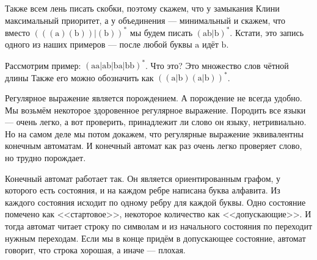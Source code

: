 \documentclass{article}
\begin{document}
\begin{itemize}
\begin{Comment}
            Также всем лень писать скобки, поэтому скажем, что у замыкания Клини максимальный приоритет, а у объединения --- минимальный и скажем, что вместо $(((\mathrm a)(\mathrm b))|(\mathrm b))^*$ мы будем писать $(\mathrm a\mathrm b|\mathrm b)^*$. Кстати, это запись одного из наших примеров --- после любой буквы $\mathrm a$ идёт $\mathrm b$.
        \end{Comment}
        \begin{Example}
            Рассмотрим пример: $(\mathrm{aa}|\mathrm{ab}|\mathrm{ba}|\mathrm{bb})^*$. Что это? Это множество слов чётной длины Также его можно обозначить как $((\mathrm a|\mathrm b)(\mathrm a|\mathrm b))^*$.
        \end{Example}
        \begin{Comment}
            Регулярное выражение является порождением. А порождение не всегда удобно. Мы возьмём некоторое здоровенное регулярное выражение. Породить все языки --- очень легко, а вот проверить, принадлежит ли слово он языку, нетривиально. Но на самом деле мы потом докажем, что регулярные выражение эквивалентны конечным автоматам. И конечный автомат как раз очень легко проверяет слово, но трудно порождает.
        \end{Comment}
        \begin{Comment}
            Конечный автомат работает так. Он является ориентированным графом, у которого есть состояния, и на каждом ребре написана буква алфавита. Из каждого состояния исходит по одному ребру для каждой буквы. Одно состояние помечено как <<стартовое>>, некоторое количество как <<допускающие>>. И тогда автомат читает строку по символам и из начального состояния по переходит нужным переходам. Если мы в конце придём в допускающее состояние, автомат говорит, что строка хорошая, а иначе --- плохая.
        \end{Comment}
        \begin{Example}
            \begin{figure}[H]
\end{figure}
\end{Example}
\end{itemize}
\end{document}
